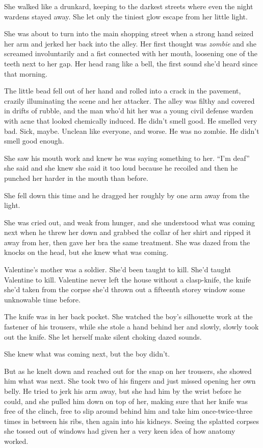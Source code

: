 She walked like a drunkard, keeping to the darkest streets where
even the night wardens stayed away. She let only the tiniest glow
escape from her little light.

She was about to turn into the main shopping street when a strong
hand seized her arm and jerked her back into the alley. Her first
thought was \emph{zombie} and she screamed involuntarily and a fist
connected with her mouth, loosening one of the teeth next to her
gap. Her head rang like a bell, the first sound she’d heard since
that morning.

The little bead fell out of her hand and rolled into a crack in the
pavement, crazily illuminating the scene and her attacker. The
alley was filthy and covered in drifts of rubble, and the man who’d
hit her was a young civil defense warden with acne that looked
chemically induced. He didn’t smell good. He smelled very bad.
Sick, maybe. Unclean like everyone, and worse. He was no zombie. He
didn’t smell good enough.

She saw his mouth work and knew he was saying something to her.
“I’m deaf” she said and she knew she said it too loud because he
recoiled and then he punched her harder in the mouth than before.

She fell down this time and he dragged her roughly by one arm away
from the light.

She was cried out, and weak from hunger, and she understood what
was coming next when he threw her down and grabbed the collar of
her shirt and ripped it away from her, then gave her bra the same
treatment. She was dazed from the knocks on the head, but she knew
what was coming.

Valentine’s mother was a soldier. She’d been taught to kill. She’d
taught Valentine to kill. Valentine never left the house without a
clasp-knife, the knife she’d taken from the corpse she’d thrown out
a fifteenth storey window some unknowable time before.

The knife was in her back pocket. She watched the boy’s silhouette
work at the fastener of his trousers, while she stole a hand behind
her and slowly, slowly took out the knife. She let herself make
silent choking dazed sounds.

She knew what was coming next, but the boy didn’t.

But as he knelt down and reached out for the snap on her trousers,
she showed him what was next. She took two of his fingers and just
missed opening her own belly. He tried to jerk his arm away, but
she had him by the wrist before he could, and she pulled him down
on top of her, making sure that her knife was free of the clinch,
free to slip around behind him and take him once-twice-three times
in between his ribs, then again into his kidneys. Seeing the
splatted corpses she tossed out of windows had given her a very
keen idea of how anatomy worked.

